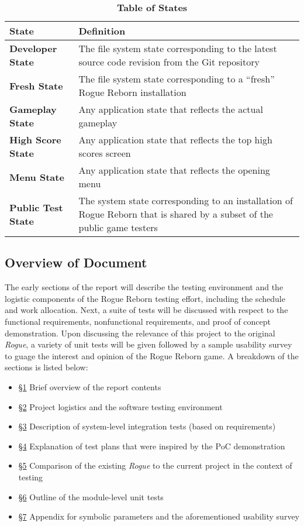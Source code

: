 \documentclass[12pt, titlepage]{article}
\begin{document}
		\begin{table}[H]
			\centering
			\caption{\textbf{Table of States}}
			\label{StateDefinitions}
			\bigskip
			\begin{tabularx}{\textwidth}{p{3.5cm}X}
				\toprule
				\textbf{State} & \textbf{Definition}\\
				\midrule
				\textbf{Developer State} & The file system state corresponding to the latest source code revision from the Git repository\\
				\textbf{Fresh State} & The file system state corresponding to a ``fresh'' Rogue Reborn installation\\
				\textbf{Gameplay State} & Any application state that reflects the actual gameplay\\
				\textbf{High Score State} & Any application state that reflects the top high scores screen\\
				\textbf{Menu State} & Any application state that reflects the opening menu\\
				\textbf{Public Test State} & The system state corresponding to an installation of Rogue Reborn that is shared by a subset of the public game testers\\
				\bottomrule
			\end{tabularx}
		\end{table}	

	\subsection{Overview of Document}
		The early sections of the report will describe the testing environment and the logistic components of the Rogue Reborn testing effort, including the schedule and work allocation.  Next, a suite of tests will be discussed with respect to the functional requirements, nonfunctional requirements, and proof of concept demonstration.  Upon discussing the relevance of this project to the original \textit{Rogue}, a variety of unit tests will be given followed by a sample usability survey to guage the interest and opinion of the Rogue Reborn game.  A breakdown of the sections is listed below:

		\begin{itemize}
			\item \hyperref[section1]{\S 1} Brief overview of the report contents
			\item \hyperref[section2]{\S 2} Project logistics and the software testing environment
			\item \hyperref[section3]{\S 3} Description of system-level integration tests (based on requirements)
			\item \hyperref[section4]{\S 4} Explanation of test plans that were inspired by the PoC demonstration
			\item \hyperref[section5]{\S 5} Comparison of the existing \textit{Rogue} to the current project in the context of testing
			\item \hyperref[section6]{\S 6} Outline of the module-level unit tests 
			\item \hyperref[section7]{\S 7} Appendix for symbolic parameters and the aforementioned usability survey
		\end{itemize}
\end{document}
